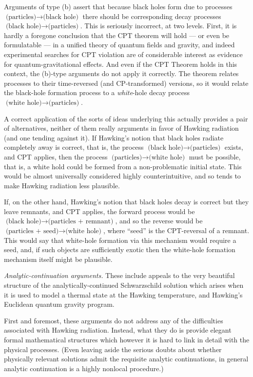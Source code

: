 \documentclass[12pt]{article}
\begin{document}
Arguments of type (b) assert that because black holes form due to processes $\mbox{(particles)}\to\mbox{(black hole)}$ there should be corresponding decay processes $\mbox{(black hole)}\to\mbox{(particles)}$.  This is seriously incorrect, at two levels. 
First, it is hardly a foregone conclusion that the CPT theorem will hold --- or even be formulatable --- in a unified theory of quantum fields and gravity, and indeed experimental searches for CPT violation are of considerable interest as evidence for quantum-gravitational effects. 
And even if the CPT Theorem holds in this context, the (b)-type arguments do not apply it correctly.
The theorem relates processes to their time-reversed (and CP-transformed) versions, so it would relate the black-hole formation process to a {\em white}-hole decay process $\mbox{(white hole)}\to\mbox{(particles)}$.

A correct application of the sorts of ideas underlying this actually provides a pair of alternatives, neither of them really arguments in favor of Hawking radiation (and one tending against it).
If Hawking's notion that black holes radiate completely away is correct, that is,
the process $\mbox{(black hole)}\to\mbox{(particles)}$ exists, and CPT applies, then the process $\mbox{(particles)}\to\mbox{(white hole)}$ must be possible, that is, a white hold could
be formed from a non-problematic initial state.
This would be almost universally considered highly counterintuitive, and so tends to make Hawking radiation less plausible. 

If, on the other hand, Hawking's notion that black holes decay is correct but they leave remnants,
and CPT applies,
the forward process would be  $\mbox{(black hole)}\to\mbox{(particles + remnant)}$, and so the reverse would be $\mbox{(particles + seed)}\to\mbox{(white hole)}$, where ``seed'' is the CPT-reversal of a remnant.  This would say that white-hole formation via this mechanism would require a seed, and, if such objects are sufficiently exotic then the white-hole formation mechanism itself might be plausible.




{\em Analytic-continuation arguments.}  These include appeals to the very beautiful structure of the analytically-continued Schwarzschild solution which arises when it is used to model a thermal state at the Hawking temperature, and Hawking's Euclidean quantum gravity program. 


First and foremost, these arguments do not address any of the difficulties associated with Hawking radiation.  Instead, what they do is provide elegant formal mathematical structures which however it is hard to link in detail with the physical processes.  (Even leaving aside the serious doubts about whether physically relevant solutions admit the requisite analytic continuations, in general analytic continuation is a highly nonlocal procedure.)
\end{document}
